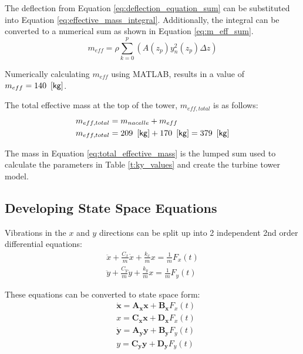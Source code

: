 The deflection from Equation \ref{eq:deflection_equation_sum} can be substituted into Equation \ref{eq:effective_mass_integral}.  Additionally, the integral can be converted to a numerical sum as shown in Equation \ref{eq:m_eff_sum}.
\begin{equation} \label{eq:m_eff_sum}
	m_{eff} = \rho \sum_{k=0}^{p}{\left(A(z_p) y_n^2(z_p) \Delta z \right)}
\end{equation}

Numerically calculating $m_{eff}$ using MATLAB, results in a value of $m_{eff}=140 \ \left[\mathsf{kg} \right]$.

The total effective mass at the top of the tower, $m_{eff,total}$ is as follows:
\begin{align}
	m_{eff,total} &= m_{nacelle} + m_{eff} \\
	m_{eff,total} &= 209 \ \left[\mathsf{kg} \right] + 170 \ \left[\mathsf{kg} \right] = 379 \ \left[\mathsf{kg} \right] \label{eq:total_effective_mass}
\end{align}

The mass in Equation \ref{eq:total_effective_mass} is the lumped sum used to calculate the  parameters in Table \ref{t:ky_values} and create the turbine tower model.

\subsection{Developing State Space Equations}
Vibrations in the $x$ and $y$ directions can be split up into 2 independent 2nd order differential equations:
\begin{align}
	\ddot{x} + \frac{C_x}{m} \dot{x} + \frac{k_x}{m} x = \frac{1}{m} F_x(t) \\
	\ddot{y} + \frac{C_y}{m} \dot{y} + \frac{k_y}{m} x = \frac{1}{m} F_y(t)
\end{align}

These equations can be converted to state space form:
\begin{align}
	&\bm{\dot{x}} = \bm{A_x} \bm{x} + \bm{B_x} F_x(t) \\
	&x = \bm{C_x} \bm{x} + \bm{D_x} F_x(t) \\
	&\bm{\dot{y}} = \bm{A_y} \bm{y} + \bm{B_y} F_y(t) \\
	&y = \bm{C_y} \bm{y} + \bm{D_y} F_y(t)
\end{align}

